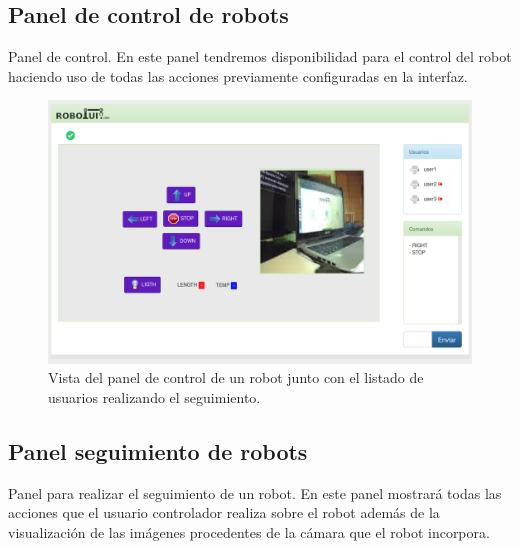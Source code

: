 \documentclass[a4paper,12pt]{article}
\begin{document}
\subsection{ Panel de control de robots }

Panel de control. En este panel tendremos disponibilidad para el control del robot haciendo uso de todas las acciones previamente configuradas en la interfaz.\\

\begin{figure}[H]
  \begin{center}
    \includegraphics[scale=.31]{imagenes/vista_control.png}
  \end{center}
  \caption{ Vista del panel de control de un robot junto con el listado de usuarios realizando el seguimiento.}
  \label{website:ventana-control}
\end{figure}

\subsection{ Panel seguimiento de robots }

Panel para realizar el seguimiento de un robot. En este panel mostrará todas las acciones que el usuario controlador realiza sobre el robot además de la visualización de las imágenes procedentes de la cámara
que el robot incorpora.\\
\end{document}

